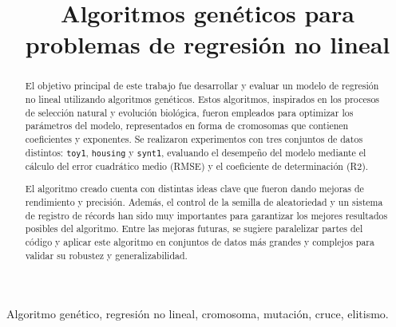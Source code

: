 \documentclass[conference,a4paper]{IEEEtran}
\begin{document}
\title{Algoritmos genéticos para problemas de regresión no lineal}

\author{
  
  \and
  
}

\maketitle


\begin{abstract}
  El objetivo principal de este trabajo fue desarrollar y evaluar un modelo de regresión no lineal utilizando algoritmos genéticos. Estos algoritmos, inspirados en los procesos de selección natural y evolución biológica, fueron empleados para optimizar los parámetros del modelo, representados en forma de cromosomas que contienen coeficientes y exponentes. Se realizaron experimentos con tres conjuntos de datos distintos: \texttt{toy1}, \texttt{housing} y \texttt{synt1}, evaluando el desempeño del modelo mediante el cálculo del error cuadrático medio (RMSE) y el coeficiente de determinación (R2).

El algoritmo creado cuenta con distintas ideas clave que fueron dando mejoras de rendimiento y precisión. Además, el control de la semilla de aleatoriedad y un sistema de registro de récords han sido muy importantes para garantizar los mejores resultados posibles del algoritmo. Entre las mejoras futuras, se sugiere paralelizar partes del código y aplicar este algoritmo en conjuntos de datos más grandes y complejos para validar su robustez y generalizabilidad.
\end{abstract}


\begin{IEEEkeywords}
  Algoritmo genético, regresión no lineal, cromosoma, mutación, cruce, elitismo.
\end{IEEEkeywords}
\end{document}
